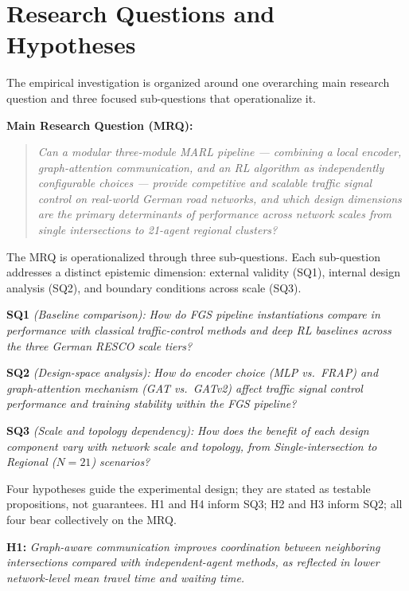 \section{Research Questions and Hypotheses}
\label{sec:Introduction_ResearchQuestions}

The empirical investigation is organized around one overarching main research question and three focused sub-questions that operationalize it.

\medskip
\noindent\textbf{Main Research Question (MRQ):}
\begin{quote}
  \textit{Can a modular three-module MARL pipeline — combining a local encoder, graph-attention communication, and an RL algorithm as independently configurable choices — provide competitive and scalable traffic signal control on real-world German road networks, and which design dimensions are the primary determinants of performance across network scales from single intersections to 21-agent regional clusters?}
\end{quote}

\medskip
The MRQ is operationalized through three sub-questions. Each sub-question addresses a distinct epistemic dimension: external validity (SQ1), internal design analysis (SQ2), and boundary conditions across scale (SQ3).

\medskip
\noindent\textbf{SQ1} \textit{(Baseline comparison):} \textit{How do FGS pipeline instantiations compare in performance with classical traffic-control methods and deep RL baselines across the three German RESCO scale tiers?}

\medskip
\noindent\textbf{SQ2} \textit{(Design-space analysis):} \textit{How do encoder choice (MLP vs.\ FRAP) and graph-attention mechanism (GAT vs.\ GATv2) affect traffic signal control performance and training stability within the FGS pipeline?}

\medskip
\noindent\textbf{SQ3} \textit{(Scale and topology dependency):} \textit{How does the benefit of each design component vary with network scale and topology, from Single-intersection to Regional ($N=21$) scenarios?}

\medskip

Four hypotheses guide the experimental design; they are stated as testable propositions, not guarantees. H1 and H4 inform SQ3; H2 and H3 inform SQ2; all four bear collectively on the MRQ.

\medskip
\noindent\textbf{H1:} \textit{Graph-aware communication improves coordination between neighboring intersections compared with independent-agent methods, as reflected in lower network-level mean travel time and waiting time.}

